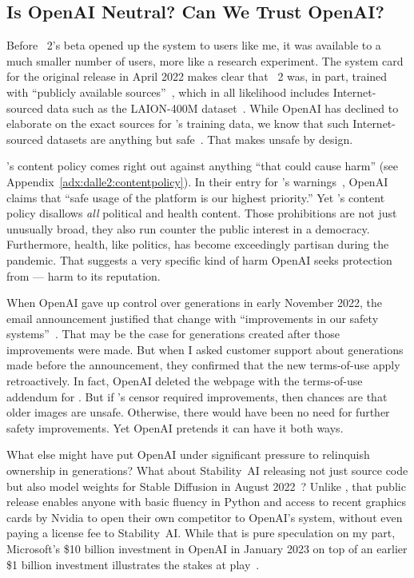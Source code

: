 \subsection{Is OpenAI Neutral? Can We Trust OpenAI?}

Before \DALLE~2's beta opened up the system to users like me, it was available
to a much smaller number of users, more like a research experiment. The system
card~\cite{GreenProcopeea2022,ProcopeCheemaea2022} for the original release in
April 2022 makes clear that \DALLE~2 was, in part, trained with ``publicly
available sources''~\cite{MishkinAhmad2022}, which in all likelihood includes
Internet-sourced data such as the LAION-400M
dataset~\cite{SchuhmannVencuea2021}. While OpenAI has declined to elaborate on
the exact sources for \DALLE's training data, we know that such Internet-sourced
datasets are anything but safe~\cite{BirhanePrabhuea2021}. That makes \DALLE{}
unsafe by design.

\DALLE's content policy comes right out against anything ``that could cause
harm'' (see Appendix~\ref{adx:dalle2:contentpolicy}). In their \FAQ{} entry for
\DALLE's warnings~\cite{Natalie2022}, OpenAI claims that ``safe usage of the
platform is our highest priority.'' Yet \DALLE's content policy disallows
\emph{all} political and health content. Those prohibitions are not just
unusually broad, they also run counter the public interest in a democracy.
Furthermore, health, like politics, has become exceedingly partisan during the
pandemic. That suggests a very specific kind of harm OpenAI seeks protection
from --- harm to its reputation.

When OpenAI gave up control over generations in early November 2022, the email
announcement justified that change with ``improvements in our safety
systems''~\cite{OpenAI2022g}. That may be the case for generations created after
those improvements were made. But when I asked customer support about
generations made before the announcement, they confirmed that the new
terms-of-use apply retroactively. In fact, OpenAI deleted the webpage with the
terms-of-use addendum for \DALLE. But if \DALLE's censor required improvements,
then chances are that older images are unsafe. Otherwise, there would have been
no need for further safety improvements. Yet OpenAI pretends it can have it both
ways.

What else might have put OpenAI under significant pressure to relinquish
ownership in generations? What about Stability~AI releasing not just source code
but also model weights for Stable Diffusion in August
2022~\cite{StabilityAI2022}? Unlike \DALLE, that public release enables anyone
with basic fluency in Python and access to recent graphics cards by Nvidia to
open their own competitor to OpenAI's system, without even paying a license fee
to Stability~AI. While that is pure speculation on my part, Microsoft's \$10
billion investment in OpenAI in January 2023 on top of an earlier \$1 billion
investment illustrates the stakes at play~\cite{Bass2023}.


